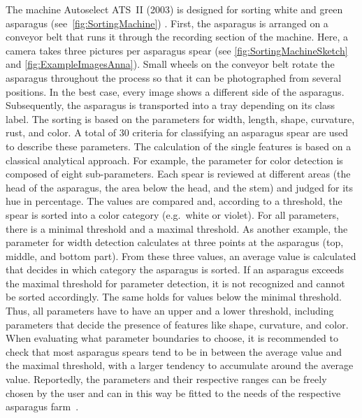 \bigskip
The machine Autoselect ATS~II (2003) is designed for sorting white and green asparagus (see~\autoref{fig:SortingMachine}) \citep{autoselectanleitung}. First, the asparagus is arranged on a conveyor belt that runs it through the recording section of the machine. Here, a camera takes three pictures per asparagus spear (see \autoref{fig:SortingMachineSketch} and \autoref{fig:ExampleImagesAnna}). Small wheels on the conveyor belt rotate the asparagus throughout the process so that it can be photographed from several positions. In the best case, every image shows a different side of the asparagus. Subsequently, the asparagus is transported  into a tray depending on its class label. The sorting is based on the parameters for width, length, shape, curvature, rust, and color. A total of 30 criteria for classifying an asparagus spear are used to describe these parameters. The calculation of the single features is based on a classical analytical approach. For example, the parameter for color detection is composed of eight sub-parameters. Each spear is reviewed at different areas (the head of the asparagus, the area below the head, and the stem) and judged for its hue in percentage. The values are compared and, according to a threshold, the spear is sorted into a color category (e.g.\, white or violet). For all parameters, there is a minimal threshold and a maximal threshold. As another example, the parameter for width detection calculates at three points at the asparagus (top, middle, and bottom part). From these three values, an average value is calculated that decides in which category the asparagus is sorted. If an asparagus exceeds the maximal threshold for parameter detection, it is not recognized and cannot be sorted accordingly. The same holds for values below the minimal threshold. Thus, all parameters have to have an upper and a lower threshold, including parameters that decide the presence of features like shape, curvature, and color. When evaluating what parameter boundaries to choose, it is recommended to check that most asparagus spears tend to be in between the average value and the maximal threshold, with a larger tendency to accumulate around the average value. Reportedly, the parameters and their respective ranges can be freely chosen by the user and can in this way be fitted to the needs of the respective asparagus farm~\citep{autoselectanleitung}.

